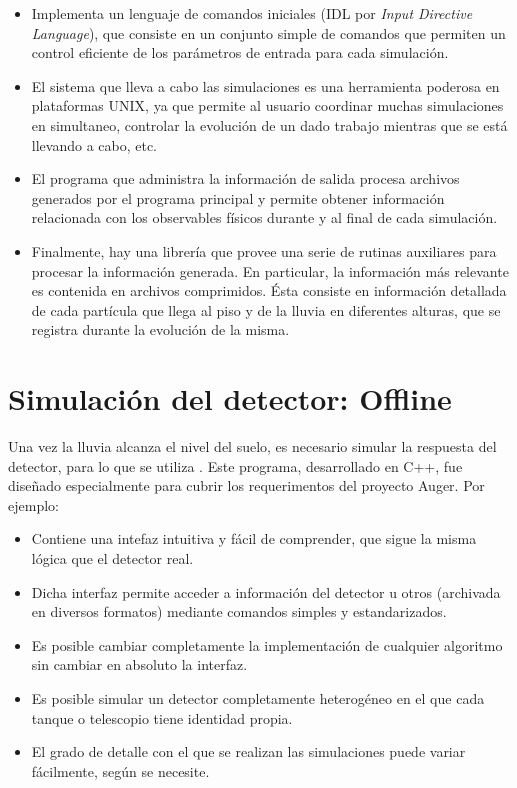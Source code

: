 	\begin{itemize}
	\item Implementa un lenguaje de comandos iniciales (IDL por {\em Input Directive Language}), que consiste en un conjunto simple de comandos que permiten un control eficiente de los par\'ametros de entrada para cada simulación. 
	\item El sistema que lleva a cabo las simulaciones es una herramienta poderosa en plataformas UNIX, ya que permite al usuario coordinar muchas simulaciones en simultaneo, controlar la evolución de un dado trabajo mientras que se está llevando a cabo, etc.
	\item El programa que administra la información de salida procesa archivos generados por el programa principal y permite obtener información relacionada con los observables físicos durante y al final de cada simulación.
	\item Finalmente, hay una librería que provee una serie de rutinas auxiliares para procesar la información generada. En particular, la información m\'as relevante es contenida en archivos comprimidos. \'Esta consiste en informaci\'on detallada de cada part\'icula que llega al piso y de la lluvia en diferentes alturas, que se registra durante la evolución de la misma.
	\end{itemize}
	
	\section{Simulaci\'on del detector: Offline}
	
	Una vez la lluvia alcanza el nivel del suelo, es necesario simular la respuesta del detector, para lo que se utiliza \Offline{}.
	Este programa, desarrollado en C++, fue dise\~nado especialmente para cubrir los requerimentos del proyecto Auger. Por ejemplo:
	\begin{itemize}
	\item Contiene una intefaz intuitiva y f\'acil de comprender, que sigue la misma l\'ogica que el detector real.
	\item Dicha interfaz permite acceder a informaci\'on del detector u otros (archivada en diversos formatos) mediante comandos simples y estandarizados.
	\item Es posible cambiar completamente la implementaci\'on de cualquier algoritmo sin cambiar en absoluto la interfaz.
	\item Es posible simular un detector completamente heterog\'eneo en el que cada tanque o telescopio tiene identidad propia.
	\item El grado de detalle con el que se realizan las simulaciones puede variar f\'acilmente, seg\'un se necesite.
	\end{itemize}
	
